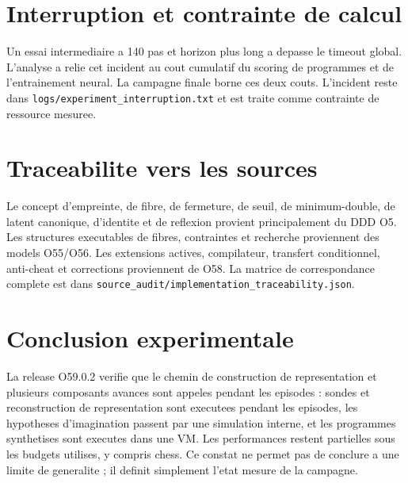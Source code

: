 \documentclass[11pt,a4paper]{article}
\begin{document}
\section{Interruption et contrainte de calcul}
Un essai intermediaire a 140 pas et horizon plus long a depasse le timeout global. L'analyse a relie cet incident au cout cumulatif du scoring de programmes et de l'entrainement neural. La campagne finale borne ces deux couts. L'incident reste dans \texttt{logs/experiment\_interruption.txt} et est traite comme contrainte de ressource mesuree.

\section{Traceabilite vers les sources}
Le concept d'empreinte, de fibre, de fermeture, de seuil, de minimum-double, de latent canonique, d'identite et de reflexion provient principalement du DDD O5. Les structures executables de fibres, contraintes et recherche proviennent des models O55/O56. Les extensions actives, compilateur, transfert conditionnel, anti-cheat et corrections proviennent de O58. La matrice de correspondance complete est dans \texttt{source\_audit/implementation\_traceability.json}.

\section{Conclusion experimentale}
La release O59.0.2 verifie que le chemin de construction de representation et plusieurs composants avances sont appeles pendant les episodes : sondes et reconstruction de representation sont executees pendant les episodes, les hypotheses d'imagination passent par une simulation interne, et les programmes synthetises sont executes dans une VM. Les performances restent partielles sous les budgets utilises, y compris chess. Ce constat ne permet pas de conclure a une limite de generalite ; il definit simplement l'etat mesure de la campagne.
\end{document}

